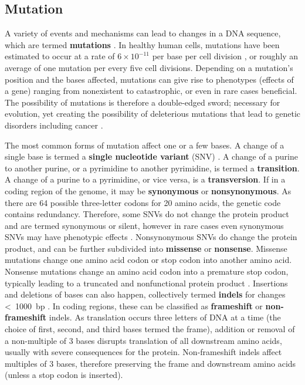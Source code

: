 \subsection{Mutation}
\label{ssec:intro:mutation}
A variety of events and mechanisms can lead to changes in a DNA sequence, which are termed \textbf{mutations} \cite{lodish2000}. In healthy human cells, mutations have been estimated to occur at a rate of $6 \times 10^{-11}$ per base per cell division \cite{lynch2010}, or roughly an average of one mutation per every five cell divisions. Depending on a mutation's position and the bases affected, mutations can give rise to phenotypes (effects of a gene) ranging from nonexistent to catastrophic, or even in rare cases beneficial. The possibility of mutations is therefore a double-edged sword; necessary for evolution, yet creating the possibility of deleterious mutations that lead to genetic disorders including cancer \cite{loewe2010}.

The most common forms of mutation affect one or a few bases. A change of a single base is termed a \textbf{single nucleotide variant} (SNV) \cite{katsonis2014}. A change of a purine to another purine, or a pyrimidine to another pyrimidine, is termed a \textbf{transition}. A change of a purine to a pyrimidine, or vice versa, is a \textbf{transversion}. If in a coding region of the genome, it may be \textbf{synonymous} or \textbf{nonsynonymous}. As there are 64 possible three-letter codons for 20 amino acids, the genetic code contains redundancy. Therefore, some SNVs do not change the protein product and are termed synonymous or silent, however in rare cases even synonymous SNVs may have phenotypic effects \cite{zheng2014}. Nonsynonymous SNVs do change the protein product, and can be further subdivided into \textbf{missense} or \textbf{nonsense}. Missense mutations change one amino acid codon or stop codon into another amino acid. Nonsense mutations change an amino acid codon into a premature stop codon, typically leading to a truncated and nonfunctional protein product \cite{jopling2014}. Insertions and deletions of bases can also happen, collectively termed \textbf{indels} for changes \textless{}~1000~bp \cite{sehn2015}. In coding regions, these can be classified as \textbf{frameshift} or \textbf{non-frameshift} indels. As translation occurs three letters of DNA at a time (the choice of first, second, and third bases termed the frame), addition or removal of a non-multiple of 3 bases disrupts translation of all downstream amino acids, usually with severe consequences for the protein. Non-frameshift indels affect multiples of 3 bases, therefore preserving the frame and downstream amino acids (unless a stop codon is inserted).

